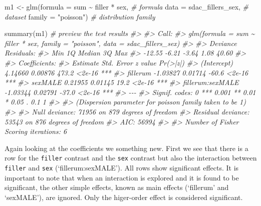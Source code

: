 \documentclass[
]{article}
\newenvironment{Shaded}{\begin{snugshade}}{\end{snugshade}}
\newcommand{\AttributeTok}[1]{\textcolor[rgb]{0.77,0.63,0.00}{#1}}
\newcommand{\CommentTok}[1]{\textcolor[rgb]{0.56,0.35,0.01}{\textit{#1}}}
\newcommand{\FunctionTok}[1]{\textcolor[rgb]{0.00,0.00,0.00}{#1}}
\newcommand{\NormalTok}[1]{#1}
\newcommand{\OtherTok}[1]{\textcolor[rgb]{0.56,0.35,0.01}{#1}}
\newcommand{\SpecialCharTok}[1]{\textcolor[rgb]{0.00,0.00,0.00}{#1}}
\newcommand{\StringTok}[1]{\textcolor[rgb]{0.31,0.60,0.02}{#1}}
\begin{document}
\begin{Shaded}
\begin{Highlighting}[]
\NormalTok{m1 }\OtherTok{\textless{}{-}} 
  \FunctionTok{glm}\NormalTok{(}\AttributeTok{formula =}\NormalTok{ sum }\SpecialCharTok{\textasciitilde{}}\NormalTok{ filler }\SpecialCharTok{*}\NormalTok{ sex, }\CommentTok{\# formula}
      \AttributeTok{data =}\NormalTok{ sdac\_fillers\_sex, }\CommentTok{\# dataset}
      \AttributeTok{family =} \StringTok{"poisson"}\NormalTok{) }\CommentTok{\# distribution family}

\FunctionTok{summary}\NormalTok{(m1) }\CommentTok{\# preview the test results}
\CommentTok{\#\textgreater{} }
\CommentTok{\#\textgreater{} Call:}
\CommentTok{\#\textgreater{} glm(formula = sum \textasciitilde{} filler * sex, family = "poisson", data = sdac\_fillers\_sex)}
\CommentTok{\#\textgreater{} }
\CommentTok{\#\textgreater{} Deviance Residuals: }
\CommentTok{\#\textgreater{}    Min      1Q  Median      3Q     Max  }
\CommentTok{\#\textgreater{} {-}12.55   {-}6.21   {-}3.64    1.08   40.60  }
\CommentTok{\#\textgreater{} }
\CommentTok{\#\textgreater{} Coefficients:}
\CommentTok{\#\textgreater{}                  Estimate Std. Error z value Pr(\textgreater{}|z|)    }
\CommentTok{\#\textgreater{} (Intercept)       4.14660    0.00876   473.2   \textless{}2e{-}16 ***}
\CommentTok{\#\textgreater{} fillerum         {-}1.03827    0.01714   {-}60.6   \textless{}2e{-}16 ***}
\CommentTok{\#\textgreater{} sexMALE           0.21955    0.01145    19.2   \textless{}2e{-}16 ***}
\CommentTok{\#\textgreater{} fillerum:sexMALE {-}1.03344    0.02791   {-}37.0   \textless{}2e{-}16 ***}
\CommentTok{\#\textgreater{} {-}{-}{-}}
\CommentTok{\#\textgreater{} Signif. codes:  0 \textquotesingle{}***\textquotesingle{} 0.001 \textquotesingle{}**\textquotesingle{} 0.01 \textquotesingle{}*\textquotesingle{} 0.05 \textquotesingle{}.\textquotesingle{} 0.1 \textquotesingle{} \textquotesingle{} 1}
\CommentTok{\#\textgreater{} }
\CommentTok{\#\textgreater{} (Dispersion parameter for poisson family taken to be 1)}
\CommentTok{\#\textgreater{} }
\CommentTok{\#\textgreater{}     Null deviance: 71956  on 879  degrees of freedom}
\CommentTok{\#\textgreater{} Residual deviance: 53543  on 876  degrees of freedom}
\CommentTok{\#\textgreater{} AIC: 56994}
\CommentTok{\#\textgreater{} }
\CommentTok{\#\textgreater{} Number of Fisher Scoring iterations: 6}
\end{Highlighting}
\end{Shaded}

Again looking at the coefficients we something new. First we see that there is a row for the \texttt{filler} contrast and the \texttt{sex} contrast but also the interaction between \texttt{filler} and \texttt{sex} (`fillerum:sexMALE'). All rows show significant effects. It is important to note that when an interaction is explored and it is found to be significant, the other simple effects, known as main effects (`fillerum' and `sexMALE'), are ignored. Only the higer-order effect is considered significant.
\end{document}
